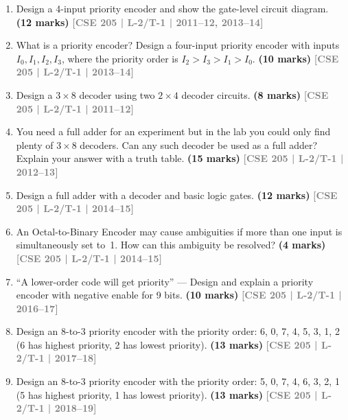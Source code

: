 \documentclass[12pt,a4paper]{article}
\newcommand{\yr}[1]{\hfill\textcolor{gray}{\small\textbf{[#1]}}}
\newcommand{\mk}[1]{\textcolor{orange!70!black}{\small\textbf{(#1 marks)}}}
\begin{document}
\begin{enumerate}

\item Design a 4-input priority encoder and show the gate-level circuit diagram.
\mk{12} \yr{CSE 205 | L-2/T-1 | 2011--12, 2013--14}

\item What is a priority encoder? Design a four-input priority encoder with inputs $I_0, I_1, I_2, I_3$, where the priority order is $I_2 > I_3 > I_1 > I_0$.
\mk{10} \yr{CSE 205 | L-2/T-1 | 2013--14}

\item Design a $3 \times 8$ decoder using two $2 \times 4$ decoder circuits.
\mk{8} \yr{CSE 205 | L-2/T-1 | 2011--12}

\item You need a full adder for an experiment but in the lab you could only find plenty of $3 \times 8$ decoders. Can any such decoder be used as a full adder? Explain your answer with a truth table.
\mk{15} \yr{CSE 205 | L-2/T-1 | 2012--13}


\item Design a full adder with a decoder and basic logic gates.
\mk{12} \yr{CSE 205 | L-2/T-1 | 2014--15}

\item An Octal-to-Binary Encoder may cause ambiguities if more than one input is simultaneously set to~1. How can this ambiguity be resolved?
\mk{4} \yr{CSE 205 | L-2/T-1 | 2014--15}


\item ``A lower-order code will get priority'' --- Design and explain a priority encoder with negative enable for 9 bits.
\mk{10} \yr{CSE 205 | L-2/T-1 | 2016--17}

\item Design an 8-to-3 priority encoder with the priority order: 6, 0, 7, 4, 5, 3, 1, 2 (6 has highest priority, 2 has lowest priority).
\mk{13} \yr{CSE 205 | L-2/T-1 | 2017--18}

\item Design an 8-to-3 priority encoder with the priority order: 5, 0, 7, 4, 6, 3, 2, 1 (5 has highest priority, 1 has lowest priority).
\mk{13} \yr{CSE 205 | L-2/T-1 | 2018--19}


\end{enumerate}
\end{document}
